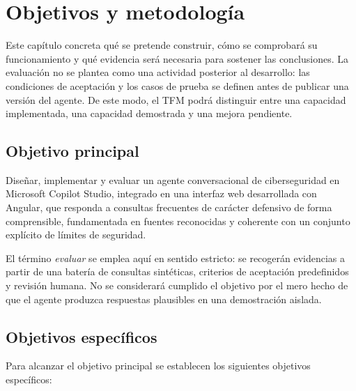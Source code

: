 \chapter{Objetivos y metodología}
\label{chap:objetivos-metodologia}

Este capítulo concreta qué se pretende construir, cómo se comprobará su
funcionamiento y qué evidencia será necesaria para sostener las conclusiones. La
evaluación no se plantea como una actividad posterior al desarrollo: las
condiciones de aceptación y los casos de prueba se definen antes de publicar una
versión del agente. De este modo, el TFM podrá distinguir entre una capacidad
implementada, una capacidad demostrada y una mejora pendiente.

\section{Objetivo principal}
\label{sec:objetivo-principal}

Diseñar, implementar y evaluar un agente conversacional de ciberseguridad en
Microsoft Copilot Studio, integrado en una interfaz web desarrollada con Angular,
que responda a consultas frecuentes de carácter defensivo de forma comprensible,
fundamentada en fuentes reconocidas y coherente con un conjunto explícito de
límites de seguridad.

El término \emph{evaluar} se emplea aquí en sentido estricto: se recogerán
evidencias a partir de una batería de consultas sintéticas, criterios de
aceptación predefinidos y revisión humana. No se considerará cumplido el objetivo
por el mero hecho de que el agente produzca respuestas plausibles en una
demostración aislada.

\section{Objetivos específicos}
\label{sec:objetivos-especificos}

Para alcanzar el objetivo principal se establecen los siguientes objetivos
específicos:

